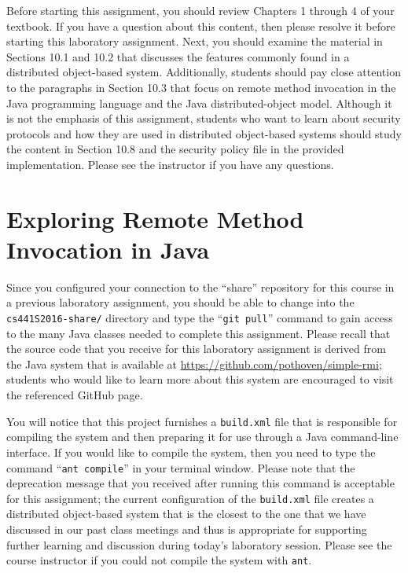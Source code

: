 Before starting this assignment, you should review Chapters 1 through 4 of your textbook. If you have a question about
this content, then please resolve it before starting this laboratory assignment. Next, you should examine the material
in Sections 10.1 and 10.2 that discusses the features commonly found in a distributed object-based system. Additionally,
students should pay close attention to the paragraphs in Section 10.3 that focus on remote method invocation in the Java
programming language and the Java distributed-object model. Although it is not the emphasis of this assignment, students
who want to learn about security protocols and how they are used in distributed object-based systems should study the
content in Section 10.8 and the security policy file in the provided implementation.  Please see the instructor if you
have any questions.

\section*{Exploring Remote Method Invocation in Java}

Since you configured your connection to the ``share'' repository for this course in a previous laboratory assignment,
you should be able to change into the {\tt cs441S2016-share/} directory and type the ``{\tt git pull}'' command to gain
access to the many Java classes needed to complete this assignment. Please recall that the source code that you receive
for this laboratory assignment is derived from the Java system that is available at
\url{https://github.com/pothoven/simple-rmi}; students who would like to learn more about this system are encouraged to
visit the referenced GitHub page.

You will notice that this project furnishes a {\tt build.xml} file that is responsible for compiling the system and then
preparing it for use through a Java command-line interface. If you would like to compile the system, then you need to
type the command ``{\tt ant compile}'' in your terminal window. Please note that the deprecation message that you
received after running this command is acceptable for this assignment; the current configuration of the {\tt build.xml}
file creates a distributed object-based system that is the closest to the one that we have discussed in our past class
meetings and thus is appropriate for supporting further learning and discussion during today's laboratory session.
Please see the course instructor if you could not compile the system with {\tt ant}.



